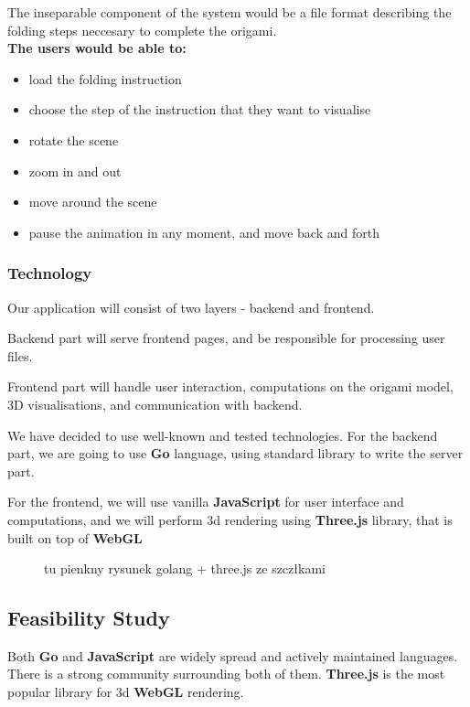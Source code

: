 The inseparable component of the system would be a file format describing the folding steps neccesary to complete the origami.\\

\noindent \textbf{The users would be able to:}
\begin{itemize}
	\item load the folding instruction
	\item choose the step of the instruction that they want to visualise
	\item rotate the scene
    \item zoom in and out
	\item move around the scene
	\item pause the animation in any moment, and move back and forth
\end{itemize}

\subsubsection{Technology}

Our application will consist of two layers - backend and frontend.

Backend part will serve frontend pages, and be responsible
for processing user files.

Frontend part will handle user interaction, computations on the origami model,
3D visualisations, and communication with backend.

We have decided to use well-known and tested technologies.
For the backend part, we are going to use \textbf{Go} language,
using standard library to write the server part.

For the frontend, we will use vanilla \textbf{JavaScript}
for user interface and computations,
and we will perform 3d rendering using \textbf{Three.js} library,
that is built on top of \textbf{WebGL}

\begin{figure}
	tu pienkny rysunek golang + three.js ze szczłkami
\end{figure}


\subsection{Feasibility Study}

Both \textbf{Go} and \textbf{JavaScript} are widely spread and actively maintained languages.
There is a strong community surrounding both of them.
\textbf{Three.js} is the most popular library for 3d \textbf{WebGL} rendering.

